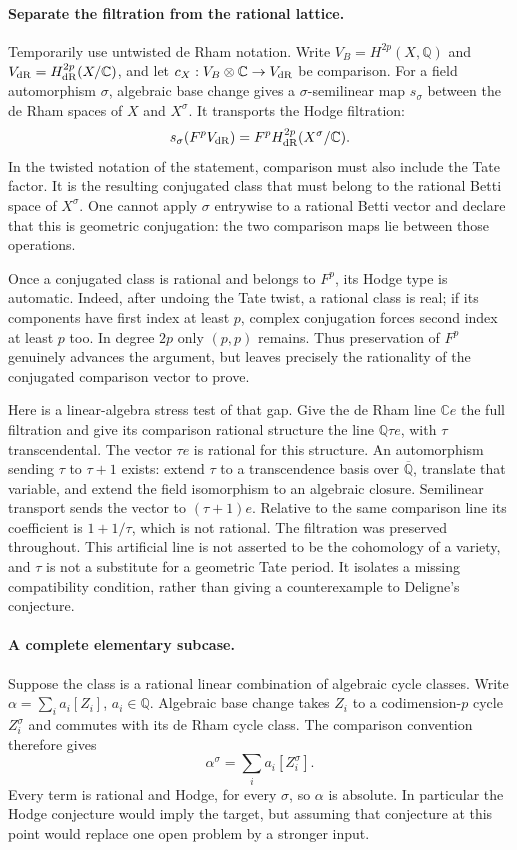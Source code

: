 \documentclass[11pt]{article}
\begin{document}
\paragraph{Separate the filtration from the rational lattice.}
Temporarily use untwisted de Rham notation. Write
$V_B=H^{2p}(X,\mathbb Q)$ and $V_{\rm dR}=H^{2p}_{\rm dR}(X/\mathbb C)$,
and let $c_X:V_B\otimes\mathbb C\to V_{\rm dR}$ be comparison.
For a field automorphism $\sigma$, algebraic base change gives a
$\sigma$-semilinear map $s_\sigma$ between the de Rham spaces of $X$
and $X^\sigma$. It transports the Hodge filtration:
\[
 s_\sigma(F^pV_{\rm dR})=F^pH^{2p}_{\rm dR}(X^\sigma/\mathbb C).
\]
In the twisted notation of the statement, comparison must also include
the Tate factor. It is the resulting conjugated class that must belong
to the rational Betti space of $X^\sigma$. One cannot apply $\sigma$
entrywise to a rational Betti vector and declare that this is geometric
conjugation: the two comparison maps lie between those operations.

Once a conjugated class is rational and belongs to $F^p$, its Hodge type
is automatic. Indeed, after undoing the Tate twist, a rational class is real; if its components have
first index at least $p$, complex conjugation forces second index at
least $p$ too. In degree $2p$ only $(p,p)$ remains. Thus preservation of
$F^p$ genuinely advances the argument, but leaves precisely the
rationality of the conjugated comparison vector to prove.

Here is a linear-algebra stress test of that gap. Give the de Rham line
$\mathbb Ce$ the full filtration and give its comparison rational
structure the line $\mathbb Q\tau e$, with $\tau$ transcendental. The
vector $\tau e$ is rational for this structure. An automorphism sending
$\tau$ to $\tau+1$ exists: extend $\tau$ to a transcendence basis over
$\overline{\mathbb Q}$, translate that variable, and extend the field
isomorphism to an algebraic closure. Semilinear transport sends the
vector to $(\tau+1)e$. Relative to the same comparison line its
coefficient is $1+1/\tau$, which is not rational. The filtration was
preserved throughout. This artificial line is not asserted to be the
cohomology of a variety, and $\tau$ is not a substitute for a geometric
Tate period. It isolates a missing compatibility condition, rather than
giving a counterexample to Deligne's conjecture.

\paragraph{A complete elementary subcase.}
Suppose the class is a rational linear combination of algebraic cycle
classes. Write $\alpha=\sum_i a_i[Z_i]$, $a_i\in\mathbb Q$.
Algebraic base change takes $Z_i$ to a codimension-$p$ cycle
$Z_i^\sigma$ and commutes with its de Rham cycle class. The comparison
convention therefore gives
\[
                   \alpha^\sigma=\sum_i a_i[Z_i^\sigma].
\]
Every term is rational and Hodge, for every $\sigma$, so $\alpha$ is
absolute. In particular the Hodge conjecture would imply the target,
but assuming that conjecture at this point would replace one open
problem by a stronger input.
\end{document}

